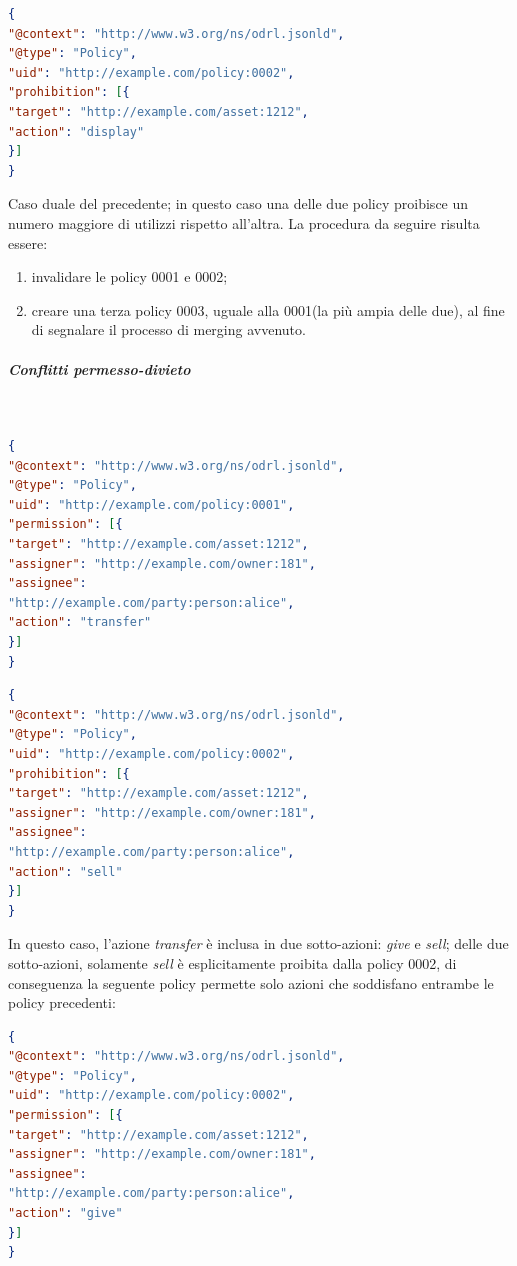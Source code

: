 \documentclass[12pt,a4paper,twoside]{book}
\begin{document}
\begin{lstlisting}[language=json,firstnumber=1,caption={La policy 0002 proibisce la riproduzione dell'asset 1212 a chiunque},captionpos=b]
{
"@context": "http://www.w3.org/ns/odrl.jsonld",
"@type": "Policy",
"uid": "http://example.com/policy:0002",
"prohibition": [{
"target": "http://example.com/asset:1212",
"action": "display"
}]
}
\end{lstlisting}
Caso duale del precedente; in questo caso una delle due policy proibisce un numero maggiore di utilizzi rispetto all'altra. La procedura da seguire risulta essere:
\begin{enumerate}
	\item invalidare le policy 0001 e 0002;
	\item creare una terza policy 0003, uguale alla 0001(la più ampia delle due), al fine di segnalare il processo di merging avvenuto.
\end{enumerate}
\subparagraph{Conflitti permesso-divieto}\label{permdiv}\mbox{}\\
\begin{lstlisting}[language=json,firstnumber=1,caption={La policy 0001 permette il trasferimento dell'asset 1212 al soggetto Alice},captionpos=b]
{
"@context": "http://www.w3.org/ns/odrl.jsonld",
"@type": "Policy",
"uid": "http://example.com/policy:0001",
"permission": [{
"target": "http://example.com/asset:1212",
"assigner": "http://example.com/owner:181",
"assignee": 
"http://example.com/party:person:alice",
"action": "transfer"
}]
}
\end{lstlisting}
\begin{lstlisting}[language=json,firstnumber=1,caption={La policy 0002 proibisce la vendita dell'asset 1212 al soggetto Alice},captionpos=b]
{
"@context": "http://www.w3.org/ns/odrl.jsonld",
"@type": "Policy",
"uid": "http://example.com/policy:0002",
"prohibition": [{
"target": "http://example.com/asset:1212",
"assigner": "http://example.com/owner:181",
"assignee": 
"http://example.com/party:person:alice",
"action": "sell"
}]
}
\end{lstlisting}
In questo caso, l'azione \textit{transfer} è inclusa in due sotto-azioni: \textit{give} e \textit{sell}; delle due sotto-azioni, solamente \textit{sell} è esplicitamente proibita dalla policy 0002, di conseguenza la seguente policy permette solo azioni che soddisfano entrambe le policy precedenti:\newpage
\begin{lstlisting}[language=json,firstnumber=1,caption={La policy 0003 consente al soggetto Alice di cedere l'asset 1212 senza richiedere un compenso e cancellando l'asset dal proprio insieme di dati},captionpos=b]
{
"@context": "http://www.w3.org/ns/odrl.jsonld",
"@type": "Policy",
"uid": "http://example.com/policy:0002",
"permission": [{
"target": "http://example.com/asset:1212",
"assigner": "http://example.com/owner:181",
"assignee": 
"http://example.com/party:person:alice",
"action": "give"
}]
}
\end{lstlisting}
\end{document}
